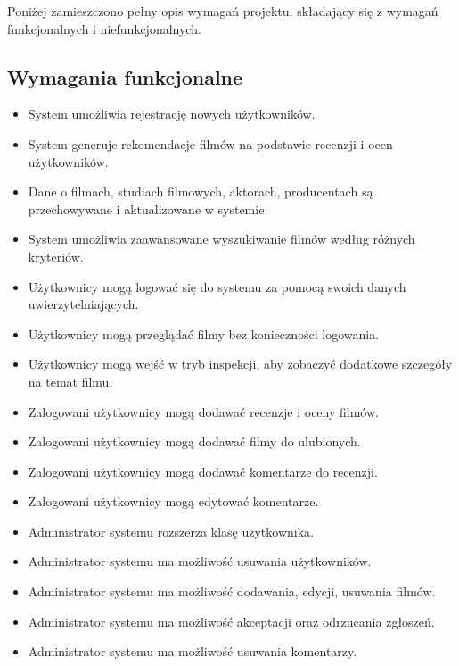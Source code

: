 \documentclass[../main.tex]{subfiles}
\begin{document}
Poniżej zamieszczono pełny opis wymagań projektu, składający się z wymagań funkcjonalnych i niefunkcjonalnych.

\subsection{Wymagania funkcjonalne}
\begin{itemize}
	\item System umożliwia rejestrację nowych użytkowników.
	\item System generuje rekomendacje filmów na podstawie recenzji i ocen użytkowników.
	\item Dane o filmach, studiach filmowych, aktorach, producentach są przechowywane i aktualizowane w systemie.
	\item System umożliwia zaawansowane wyszukiwanie filmów według różnych kryteriów.
	\item Użytkownicy mogą logować się do systemu za pomocą swoich danych uwierzytelniających.
	\item Użytkownicy mogą przeglądać filmy bez konieczności logowania.
	\item Użytkownicy mogą wejść w tryb inspekcji, aby zobaczyć dodatkowe szczegóły na temat filmu.
	\item Zalogowani użytkownicy mogą dodawać recenzje i oceny filmów.
	\item Zalogowani użytkownicy mogą dodawać filmy do ulubionych.
	\item Zalogowani użytkownicy mogą dodawać komentarze do recenzji.
	\item Zalogowani użytkownicy mogą edytować komentarze.
	\item Administrator systemu rozszerza klasę użytkownika.
	\item Administrator systemu ma możliwość usuwania użytkowników.
	\item Administrator systemu ma możliwość dodawania, edycji, usuwania filmów.
	\item Administrator systemu ma możliwość akceptacji oraz odrzucania zgłoszeń.
	\item Administrator systemu ma możliwość usuwania komentarzy.
\end{itemize}
\end{document}
